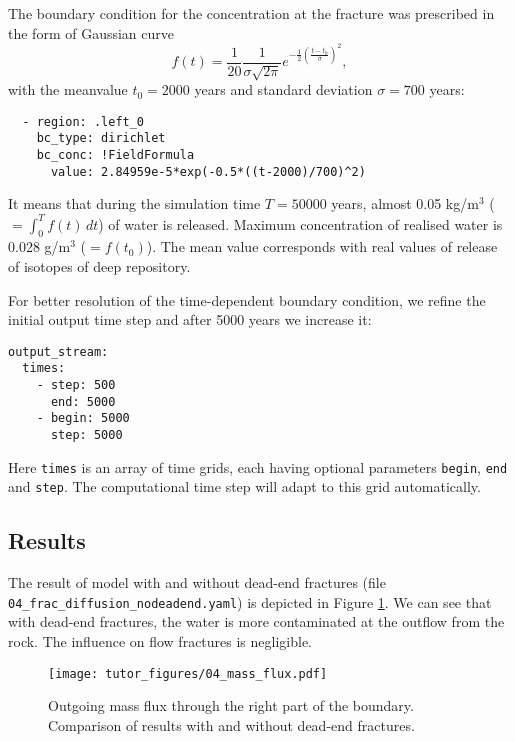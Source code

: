 The boundary condition for the concentration at the fracture was
prescribed in the form of Gaussian curve
\[ f(t) = \frac1{20} \frac{1}{\sigma\sqrt{2\pi}}e^{-\frac12\left(\frac{t-t_0}{\sigma}\right)^2}, \]
with the meanvalue \(t_0=2000\) years and standard deviation
\(\sigma=700\) years:

\begin{verbatim}
  - region: .left_0
    bc_type: dirichlet
    bc_conc: !FieldFormula
      value: 2.84959e-5*exp(-0.5*((t-2000)/700)^2)
\end{verbatim}

It means that during the simulation time \(T=50000\) years, almost 0.05
kg/m\(^3\) (\(=\int_0^Tf(t)\,dt\)) of water is released. Maximum
concentration of realised water is 0.028 g/m\(^3\) (\(=f(t_0)\)). The
mean value corresponds with real values of release of isotopes of deep
repository.

For better resolution of the time-dependent boundary condition, we
refine the initial output time step and after 5000 years we increase it:

\begin{verbatim}
output_stream:
  times:
    - step: 500
      end: 5000
    - begin: 5000
      step: 5000
\end{verbatim}

Here \texttt{times} is an array of time grids, each having optional
parameters \texttt{begin}, \texttt{end} and \texttt{step}. The
computational time step will adapt to this grid automatically.

\subsection{Results}

The result of model with and without dead-end fractures (file
\texttt{04\_frac\_diffusion\_nodeadend.yaml}) is depicted in Figure
\ref{fig:diff_res}. We can see that with dead-end fractures, the water
is more contaminated at the outflow from the rock. The influence on flow
fractures is negligible.

\begin{figure}
\hypertarget{fig:diff_res}{%
\centering
\texttt{[image: tutor\_figures/04\_mass\_flux.pdf]}
\caption{Outgoing mass flux through the right part of the boundary.
Comparison of results with and without dead-end
fractures.}\label{fig:diff_res}
}
\end{figure}
